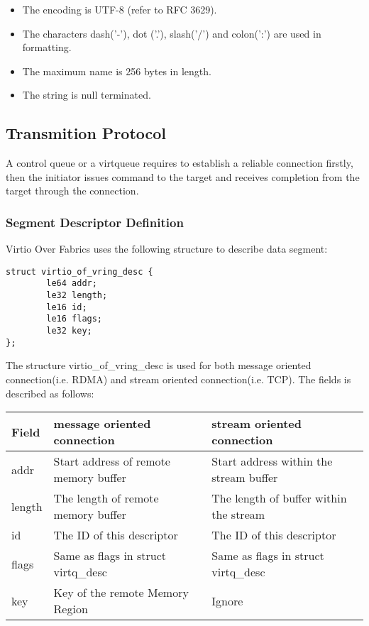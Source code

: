 \begin{itemize}
\item The encoding is UTF-8 (refer to RFC 3629).
\item The characters dash('-'), dot ('.'), slash('/') and colon(':') are used in formatting.
\item The maximum name is 256 bytes in length.
\item The string is null terminated.
\end{itemize}

\subsection{Transmition Protocol}\label{sec:Virtio Transport Options / Virtio Over Fabrics / Transmition Protocol}
A control queue or a virtqueue requires to establish a reliable connection firstly, then the initiator issues command to the target and receives completion from the target through the connection.

\subsubsection{Segment Descriptor Definition}\label{sec:Virtio Transport Options / Virtio Over Fabrics / Transmition Protocol / Segment Descriptor Definition}
Virtio Over Fabrics uses the following structure to describe data segment:
\begin{lstlisting}
struct virtio_of_vring_desc {
        le64 addr;
        le32 length;
        le16 id;
        le16 flags;
        le32 key;
};
\end{lstlisting}

The structure virtio_of_vring_desc is used for both message oriented connection(i.e. RDMA) and stream oriented connection(i.e. TCP). The fields is described as follows:

\begin{tabular}{ |l|l|l| }
\hline
Field & message oriented connection & stream oriented connection \\
\hline \hline
addr & Start address of remote memory buffer & Start address within the stream buffer \\
\hline
length & The length of remote memory buffer & The length of buffer within the stream \\
\hline
id & The ID of this descriptor & The ID of this descriptor \\
\hline
flags & Same as flags in struct virtq_desc & Same as flags in struct virtq_desc \\
\hline
key & Key of the remote Memory Region & Ignore \\
\hline
\end{tabular}

